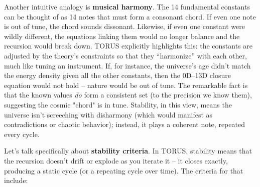 \documentclass[
]{article}
\begin{document}
Another intuitive analogy is \textbf{musical harmony}. The 14
fundamental constants can be thought of as 14 notes that must form a
consonant chord. If even one note is out of tune, the chord sounds
dissonant. Likewise, if even one constant were wildly different, the
equations linking them would no longer balance and the recursion would
break down. TORUS explicitly highlights this: the constants are adjusted
by the theory's constraints so that they ``harmonize'' with each other,
much like tuning an instrument\hspace{0pt}. If, for instance, the
universe's age didn't match the energy density given all the other
constants, then the 0D--13D closure equation would not hold -- nature
would be out of tune. The remarkable fact is that the known values
\emph{do} form a consistent set (to the precision we know them),
suggesting the cosmic "chord" is in tune. Stability, in this view, means
the universe isn't screeching with disharmony (which would manifest as
contradictions or chaotic behavior); instead, it plays a coherent note,
repeated every cycle.

Let's talk specifically about \textbf{stability criteria}. In TORUS,
stability means that the recursion doesn't drift or explode as you
iterate it -- it closes exactly, producing a static cycle (or a
repeating cycle over time). The criteria for that include:
\end{document}
